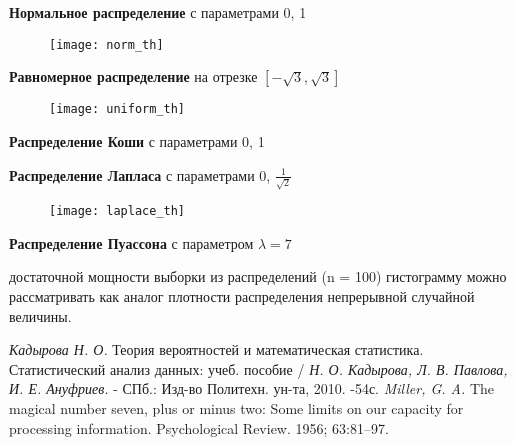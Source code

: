 \documentclass[12pt]{article}
\begin{document}
\textbf{Нормальное распределение} с параметрами 0, 1
\begin{figure}[h!]
\centering
\texttt{[image: norm\_th]}
\end{figure}

\textbf{Равномерное распределение} на отрезке $[-\sqrt{3}, \sqrt{3}]$

\begin{figure}[h!]
\centering
\texttt{[image: uniform\_th]}
\end{figure}

\textbf{Распределение Коши} с параметрами 0, 1

\begin{figure}[h!]
\centering
{}
\end{figure}

\textbf{Распределение Лапласа} с параметрами 0, $\frac{1}{\sqrt{2}}$

\begin{figure}[h!]
\centering
\texttt{[image: laplace\_th]}
\end{figure}

\indent{}
\textbf{Распределение Пуассона} с параметром $\lambda = 7$ \\

\begin{figure}[h!]
\centering
{}
\end{figure}

 достаточной мощности выборки из распределений (n = 100) гистограмму можно рассматривать как аналог плотности распределения непрерывной случайной величины.


\newpage
\begin{thebibliography}{}
	 \textit{Кадырова Н. О.} Теория вероятностей и математическая статистика. Статистический анализ данных: учеб. пособие / \textit{Н. О. Кадырова, Л. В. Павлова, И. Е. Ануфриев.} - СПб.: Изд-во Политехн. ун-та, 2010. -54с.
	 \textit{Miller, G. A.} The magical number seven, plus or minus two: Some limits on our capacity for processing information. Psychological Review. 1956; 63:81–97.
\end{thebibliography}
\end{document}
